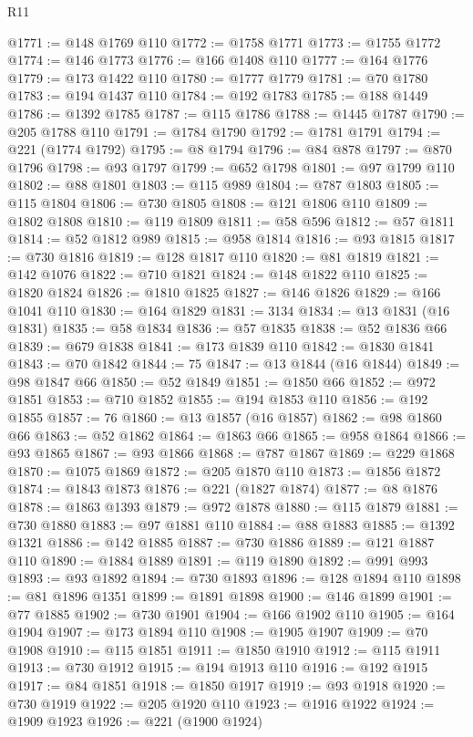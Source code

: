 \begin{lexlean}{R11}
\begin{coremodule}
@1771 := @148 @1769 @110
@1772 := @1758 @1771
@1773 := @1755 @1772
@1774 := @146 @1773
@1776 := @166 @1408 @110
@1777 := @164 @1776
@1779 := @173 @1422 @110
@1780 := @1777 @1779
@1781 := @70 @1780
@1783 := @194 @1437 @110
@1784 := @192 @1783
@1785 := @188 @1449
@1786 := @1392 @1785
@1787 := @115 @1786
@1788 := @1445 @1787
@1790 := @205 @1788 @110
@1791 := @1784 @1790
@1792 := @1781 @1791
@1794 := @221 (@1774 @1792)
@1795 := @8 @1794
@1796 := @84 @878
@1797 := @870 @1796
@1798 := @93 @1797
@1799 := @652 @1798
@1801 := @97 @1799 @110
@1802 := @88 @1801
@1803 := @115 @989
@1804 := @787 @1803
@1805 := @115 @1804
@1806 := @730 @1805
@1808 := @121 @1806 @110
@1809 := @1802 @1808
@1810 := @119 @1809
@1811 := @58 @596
@1812 := @57 @1811
@1814 := @52 @1812 @989
@1815 := @958 @1814
@1816 := @93 @1815
@1817 := @730 @1816
@1819 := @128 @1817 @110
@1820 := @81 @1819
@1821 := @142 @1076
@1822 := @710 @1821
@1824 := @148 @1822 @110
@1825 := @1820 @1824
@1826 := @1810 @1825
@1827 := @146 @1826
@1829 := @166 @1041 @110
@1830 := @164 @1829
@1831 := 3134
@1834 := @13 @1831 (@16 @1831)
@1835 := @58 @1834
@1836 := @57 @1835
@1838 := @52 @1836 @66
@1839 := @679 @1838
@1841 := @173 @1839 @110
@1842 := @1830 @1841
@1843 := @70 @1842
@1844 := 75
@1847 := @13 @1844 (@16 @1844)
@1849 := @98 @1847 @66
@1850 := @52 @1849
@1851 := @1850 @66
@1852 := @972 @1851
@1853 := @710 @1852
@1855 := @194 @1853 @110
@1856 := @192 @1855
@1857 := 76
@1860 := @13 @1857 (@16 @1857)
@1862 := @98 @1860 @66
@1863 := @52 @1862
@1864 := @1863 @66
@1865 := @958 @1864
@1866 := @93 @1865
@1867 := @93 @1866
@1868 := @787 @1867
@1869 := @229 @1868
@1870 := @1075 @1869
@1872 := @205 @1870 @110
@1873 := @1856 @1872
@1874 := @1843 @1873
@1876 := @221 (@1827 @1874)
@1877 := @8 @1876
@1878 := @1863 @1393
@1879 := @972 @1878
@1880 := @115 @1879
@1881 := @730 @1880
@1883 := @97 @1881 @110
@1884 := @88 @1883
@1885 := @1392 @1321
@1886 := @142 @1885
@1887 := @730 @1886
@1889 := @121 @1887 @110
@1890 := @1884 @1889
@1891 := @119 @1890
@1892 := @991 @993
@1893 := @93 @1892
@1894 := @730 @1893
@1896 := @128 @1894 @110
@1898 := @81 @1896 @1351
@1899 := @1891 @1898
@1900 := @146 @1899
@1901 := @77 @1885
@1902 := @730 @1901
@1904 := @166 @1902 @110
@1905 := @164 @1904
@1907 := @173 @1894 @110
@1908 := @1905 @1907
@1909 := @70 @1908
@1910 := @115 @1851
@1911 := @1850 @1910
@1912 := @115 @1911
@1913 := @730 @1912
@1915 := @194 @1913 @110
@1916 := @192 @1915
@1917 := @84 @1851
@1918 := @1850 @1917
@1919 := @93 @1918
@1920 := @730 @1919
@1922 := @205 @1920 @110
@1923 := @1916 @1922
@1924 := @1909 @1923
@1926 := @221 (@1900 @1924)

\end{coremodule}
\end{lexlean}
